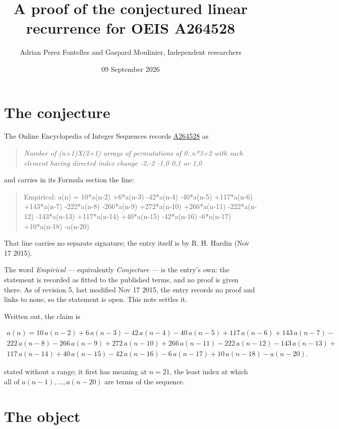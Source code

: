 \documentclass[11pt]{article}
\title{A proof of the conjectured linear recurrence for OEIS A264528}
\author{Adrian Perez Fontelles and Gaspard Moulinier, Independent researchers}
\date{09 September 2026}
\theoremstyle{definition}
\begin{document}
\maketitle
\section{The conjecture}

The Online Encyclopedia of Integer Sequences records \href{https://oeis.org/A264528}{A264528} as

\begin{quote}\itshape Number of (n+1)X(2+1) arrays of permutations of 0..n*3+2 with each element having directed index change -2,-2 -1,0 0,1 or 1,0\end{quote}

and carries in its Formula section the line:

\begin{quote}\ttfamily Empirical: a(n) = 10*a(n-2) +6*a(n-3) -42*a(n-4) -40*a(n-5) +117*a(n-6) +143*a(n-7) -222*a(n-8) -266*a(n-9) +272*a(n-10) +266*a(n-11) -222*a(n-12) -143*a(n-13) +117*a(n-14) +40*a(n-15) -42*a(n-16) -6*a(n-17) +10*a(n-18) -a(n-20)\end{quote}

That line carries no separate signature; the entry itself is by R. H. Hardin (Nov 17 2015).

The word {\itshape Empirical} --- equivalently {\itshape Conjecture} --- is the entry's own: the statement is recorded as fitted to the published terms, and no proof is given there. As of revision 5, last modified Nov 17 2015, the entry records no proof and links to none, so the statement is open. This note settles it.

Written out, the claim is

\begin{multline*} a(n) = 10\,a(n-2) + 6\,a(n-3) - 42\,a(n-4) - 40\,a(n-5) + 117\,a(n-6) + 143\,a(n-7) - \\ 222\,a(n-8) - 266\,a(n-9) + 272\,a(n-10) + 266\,a(n-11) - 222\,a(n-12) - 143\,a(n-13) + \\ 117\,a(n-14) + 40\,a(n-15) - 42\,a(n-16) - 6\,a(n-17) + 10\,a(n-18) - a(n-20). \end{multline*}

stated without a range; it first has meaning at $n = 21$, the least index at which all of $a(n-1),\dots,a(n-20)$ are terms of the sequence.

\section{The object}
\end{document}
